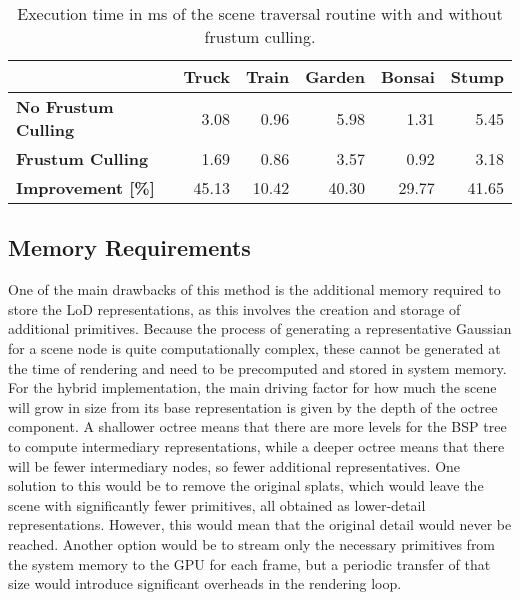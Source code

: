 \begin{table}[H]
\centering
\begin{tabular}{lr|r|r|r|r}
\multicolumn{1}{c}{}          & \multicolumn{1}{c|}{\textbf{Truck}} & \multicolumn{1}{c|}{\textbf{Train}} & \multicolumn{1}{c|}{\textbf{Garden}} & \multicolumn{1}{c|}{\textbf{Bonsai}} & \multicolumn{1}{c}{\textbf{Stump}} \\ \hline
\textbf{No Frustum Culling}   & 3.08                                & 0.96                                & 5.98                                 & 1.31                                 & 5.45                               \\
\textbf{Frustum Culling}      & 1.69                                & 0.86                                & 3.57                                 & 0.92                                 & 3.18                               \\ \hline
\textbf{Improvement {[}\%{]}} & 45.13                               & 10.42                               & 40.30                                & 29.77                                & 41.65                                   
\end{tabular}
\caption{Execution time in ms of the scene traversal routine with and without frustum culling.}
\label{tab:fcall}
\end{table}

\subsection{Memory Requirements}
One of the main drawbacks of this method is the additional memory required to store the LoD representations, as this involves the creation and storage of additional primitives. Because the process of generating a representative Gaussian for a scene node is quite computationally complex, these cannot be generated at the time of rendering and need to be precomputed and stored in system memory. For the hybrid implementation, the main driving factor for how much the scene will grow in size from its base representation is given by the depth of the octree component. A shallower octree means that there are more levels for the BSP tree to compute intermediary representations, while a deeper octree means that there will be fewer intermediary nodes, so fewer additional representatives. One solution to this would be to remove the original splats, which would leave the scene with significantly fewer primitives, all obtained as lower-detail representations. However, this would mean that the original detail would never be reached. Another option would be to stream only the necessary primitives from the system memory to the GPU for each frame, but a periodic transfer of that size would introduce significant overheads in the rendering loop. 

